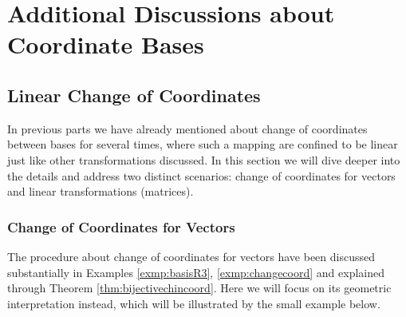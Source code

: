 \section{Additional Discussions about Coordinate Bases}

\subsection{Linear Change of Coordinates}
\label{section:coordchange}

In previous parts we have already mentioned about change of coordinates between bases for several times, where such a mapping are confined to be linear just like other transformations discussed. In this section we will dive deeper into the details and address two distinct scenarios: change of coordinates for vectors and linear transformations (matrices).

\subsubsection{Change of Coordinates for Vectors}
The procedure about change of coordinates for vectors have been discussed substantially in Examples \ref{exmp:basisR3}, \ref{exmp:changecoord} and explained through Theorem \ref{thm:bijectivechincoord}. Here we will focus on its geometric interpretation instead, which will be illustrated by the small example below.

